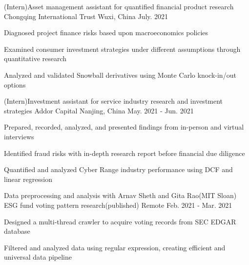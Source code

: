 \begin{cventries}
  \cventry
    {(Intern)Asset management assistant for quantified financial product research}
    {Chongqing International Trust}
    {Wuxi, China}
    {July. 2021}
    {
      \begin{cvitems}
        \item {Diagnosed project finance risks based upon macroeconomics policies}
        \item {Examined consumer investment strategies under different assumptions through quantitative research}
        \item {Analyzed and validated Snowball derivatives using Monte Carlo knock-in/out options}
      \end{cvitems}
    }

  \cventry
    {(Intern)Investment assistant for service industry research and investment strategies}
    {Addor Capital}
    {Nanjing, China}
    {May. 2021 - Jun. 2021}
    {
      \begin{cvitems}
        \item {Prepared, recorded, analyzed, and presented findings from in-person and virtual interviews }
        \item {Identified fraud risks with in-depth research report before financial due diligence}
        \item {Quantified and analyzed Cyber Range industry performance using DCF and linear regression}
      \end{cvitems}
    }

  \cventry
    {Data preprocessing and analysis with Arnav Sheth and Gita Rao(MIT Sloan)}
    {ESG fund voting pattern research(published)}
    {Remote}
    {Feb. 2021 - Mar. 2021}
    {
      \begin{cvitems}
        \item {Designed a multi-thread crawler to acquire voting records from SEC EDGAR database}
        \item {Filtered and analyzed data using regular expression, creating efficient and universal data pipeline}
      \end{cvitems}
    }
  
  \begin{comment}
  \cventry
    {Consultant}
    {Consulting with Frauenmond, TBM Inc.}
    {Seoul, Korea}
    {Oct. 2019 - Dec. 2019}
    {
      \begin{cvitems}
        \item {Analyzed Korean chocolate market with Porter's Five Forces Model and managerial accounting}
        \item {Strategized with Encouragement Study based on Genetic Matching and Regression Discontinuity}
        \item {Offered Neural Network model for Alpha/Beta tests on feature designing}
      \end{cvitems}
    }


\end{comment}
\end{cventries}
